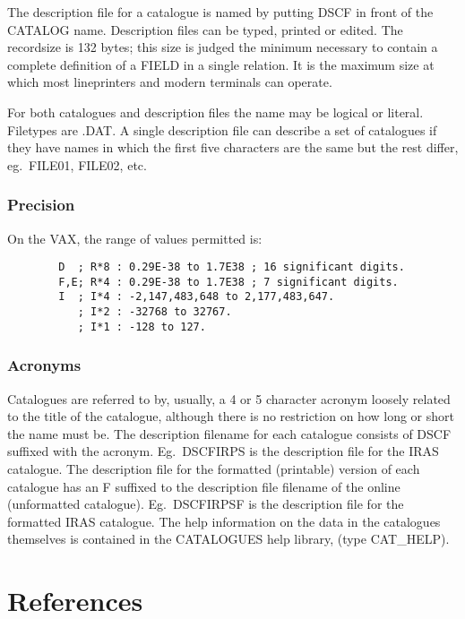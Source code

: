 The description file for a catalogue is named by putting DSCF in front of the
CATALOG name.
Description files can be typed, printed or edited.
The recordsize is 132 bytes; this size is judged the minimum necessary to
contain a complete definition of a FIELD in a single relation.
It is the maximum size at which most lineprinters and modern terminals can
operate.

For both catalogues and description files the name may be logical or literal.
Filetypes are .DAT.
A single description file can describe a set of catalogues if they have names in
which the first five characters are the same but the rest differ, eg.\ FILE01,
FILE02, etc.
\subsubsection {Precision}
On the VAX, the range of values permitted is:
\begin{verbatim}
        D  ; R*8 : 0.29E-38 to 1.7E38 ; 16 significant digits.
        F,E; R*4 : 0.29E-38 to 1.7E38 ; 7 significant digits.
        I  ; I*4 : -2,147,483,648 to 2,177,483,647.
           ; I*2 : -32768 to 32767.
           ; I*1 : -128 to 127.
\end{verbatim}
\subsubsection {Acronyms}
Catalogues are referred to by, usually, a 4 or 5 character acronym
loosely related to the title of the catalogue, although there is no restriction
on how long or short the name must be.
The description filename for each catalogue consists of DSCF suffixed with the
acronym.
Eg.\ DSCFIRPS is the description file for the IRAS catalogue.
The description file for the formatted (printable) version of each catalogue
has an F suffixed to the description file filename of the online (unformatted
catalogue).
Eg.\ DSCFIRPSF is the description file for the formatted IRAS catalogue.
The help information on the data in the catalogues themselves is contained in
the CATALOGUES help library, (type CAT\_HELP).
\section {References}

